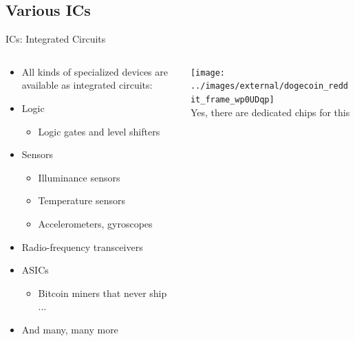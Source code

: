 \documentclass{beamer}
\begin{document}
\subsection{Various ICs}
\begin{frame}{ICs: Integrated Circuits}
  \begin{columns}[T]
    \begin{column}{.6\textwidth}
      \begin{itemize}
        \item All kinds of specialized devices are available as integrated circuits:
        \item Logic
        \begin{itemize}
          \item Logic gates and level shifters
        \end{itemize}
        \item Sensors
        \begin{itemize}
          \item Illuminance sensors
          \item Temperature sensors
          \item Accelerometers, gyroscopes
        \end{itemize}
        \item Radio-frequency transceivers
        \item ASICs
        \begin{itemize}
          \item Bitcoin miners that never ship ...
        \end{itemize}
        \item And many, many more
      \end{itemize}
    \end{column}

    \begin{column}{0.4\textwidth} \centering
      \texttt{[image: ../images/external/dogecoin\_reddit\_frame\_wp0UDqp]} \\
      Yes, there are dedicated chips for this
    \end{column}
  \end{columns}
\end{frame}
\end{document}
